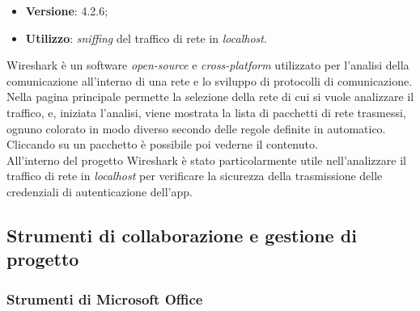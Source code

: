 \begin{itemize}
    \item \textbf{Versione}: 4.2.6;
    \item \textbf{Utilizzo}: \emph{sniffing} del traffico di rete in \emph{localhost}.
\end{itemize}
Wireshark è un software \emph{open-source} e \emph{cross-platform} utilizzato per l'analisi della comunicazione all'interno di una rete e lo sviluppo di protocolli di comunicazione. Nella pagina principale permette la selezione della rete di cui si vuole analizzare il traffico, e, iniziata l'analisi, viene mostrata la lista di pacchetti di rete trasmessi, ognuno colorato in modo diverso secondo delle regole definite in automatico. Cliccando su un pacchetto è possibile poi vederne il contenuto.\\
All'interno del progetto Wireshark è stato particolarmente utile nell'analizzare il traffico di rete in \emph{localhost} per verificare la sicurezza della trasmissione delle credenziali di autenticazione dell'app.


\subsection{Strumenti di collaborazione e gestione di progetto}

\subsubsection{Strumenti di Microsoft Office}

